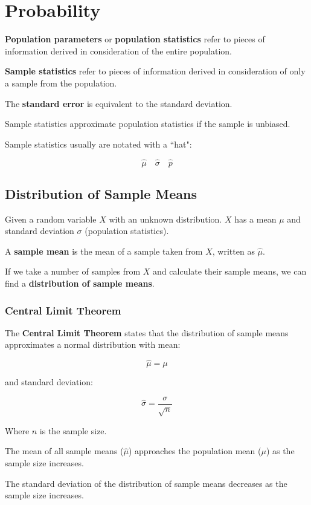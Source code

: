 \documentclass[a4paper,11pt]{report}
\begin{document}
\chapter{Probability}

\textbf{Population parameters} or \textbf{population statistics} refer to
pieces of information derived in consideration of the entire population.

\textbf{Sample statistics} refer to pieces of information derived in
consideration of only a sample from the population.

The \textbf{standard error} is equivalent to the standard deviation.

Sample statistics approximate population statistics if the sample is unbiased.

Sample statistics usually are notated with a ``hat":

$$
\hat{\mu} \quad \hat{\sigma} \quad \hat{p}
$$


\section{Distribution of Sample Means}

Given a random variable $X$ with an unknown distribution. $X$ has a mean $\mu$
and standard deviation $\sigma$ (population statistics).

A \textbf{sample mean} is the mean of a sample taken from $X$, written as
$\hat{\mu}$.

If we take a number of samples from $X$ and calculate their sample means, we
can find a \textbf{distribution of sample means}.

\subsection{Central Limit Theorem}

The \textbf{Central Limit Theorem} states that the distribution of sample means
approximates a normal distribution with mean:

$$
\hat{\mu} = \mu
$$

and standard deviation:

$$
\hat{\sigma} = \frac{\sigma}{\sqrt{n}}
$$

Where $n$ is the sample size.

The mean of all sample means ($\hat{\mu}$) approaches the population mean
($\mu$) as the sample size increases.

The standard deviation of the distribution of sample means decreases as the
sample size increases.
\end{document}
